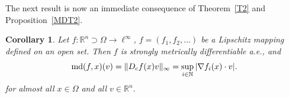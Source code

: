 \documentclass[12pt,leqno]{amsart}
\newtheorem{theorem}{Theorem}
\newtheorem{corollary}[theorem]{Corollary}
\theoremstyle{definition}
\newcommand{\bbbn}{\mathbb N}
\newcommand{\bbbr}{\mathbb R}
\def\md{\operatorname{md}}
\numberwithin{theorem}{section} \numberwithin{equation}{section}
\begin{document}
The next result is now an immediate consequence of Theorem~\ref{T2} and Proposition~\ref{MDT2}.
\begin{corollary}
\label{MDT4}
Let $f:\bbbr^n\supset\Omega\to\ell^\infty$, $f=(f_1,f_2,\ldots)$ be a Lipschitz mapping defined on an open set. Then $f$ is strongly metrically differentiable a.e., and
$$
\md (f,x)(v)=\Vert D_{\rm c}f(x)v\Vert_\infty=\sup_{i\in\bbbn}|\nabla f_i(x)\cdot v|.
$$
for almost all $x\in\Omega$ and all $v\in\bbbr^n$.
\end{corollary}
\end{document}
